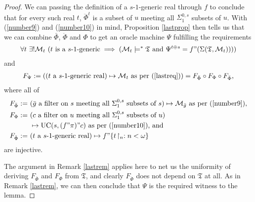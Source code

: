 \documentclass[12pt]{article}
\numberwithin{equation}{section}
\begin{document}
\begin{proof}
We can passing the definition of a $s$-$1$-generic real through $f$ to conclude that for every such real $t$, $\ddot{\Phi}^t$ is a subset of $u$ meeting all $\Sigma^{0, s}_1$ subsets of $u$. With (\ref{number9}) and (\ref{number10}) in mind, Proposition \ref{lastprop} then tells us that we can combine $\bar{\Phi}$, $\ddot{\Phi}$ and $\Phi$ to get an oracle machine $\Psi$ fulfilling the requirements 
\begin{align}\label{lastreq}
    \forall t \ \exists ! \mathcal{M}_t \ (t \text{ is a } s \text{-} 1 \text{-generic} \implies (\mathcal{M}_t \models^* \mathfrak{T} \text{ and } \Psi^{t \oplus s} = f" (\Sigma(\mathfrak{T}, \mathcal{M}_t))))
\end{align}
and 
\begin{align*}
    F_{\Psi} := ((t \text{ a } s \text{-} 1 \text{-generic real}) \mapsto \mathcal{M}_t \text{ as per (\ref{lastreq})}) = F_{\bar{\Phi}} \circ F_{\Phi} \circ F_{\ddot{\Phi}} \text{,}
\end{align*}
where all of 
\begin{align*}
    F_{\bar{\Phi}} := \ & (\bar{g} \text{ a filter on } s \text{ meeting all } \Sigma^{0, s}_1 \text{ subsets of } s) \mapsto \mathcal{M}_{\bar{g}} \text{ as per (\ref{number9}),} \\ 
    F_{\Phi} := \ & (c \text{ a filter on } u \text{ meeting all } \Sigma^{0, s}_1 \text{ subsets of } u) \\ 
    & \mapsto \mathrm{UC}(s, (f" \pi)" c) \text{ as per (\ref{number10}), and} \\
    F_{\ddot{\Phi}} := \ & (t \text{ a } s \text{-} 1 \text{-generic real}) \mapsto f" \{t \! \restriction_n : n < \omega\} 
\end{align*}
are injective.

The argument in Remark \ref{lastrem} applies here to net us the uniformity of deriving $F_{\bar{\Phi}}$ and $F_{\Phi}$ from $\mathfrak{T}$, and clearly $F_{\ddot{\Phi}}$ does not depend on $\mathfrak{T}$ at all. As in Remark \ref{lastrem}, we can then conclude that $\Psi$ is the required witness to the lemma.
\end{proof}
\end{document}
